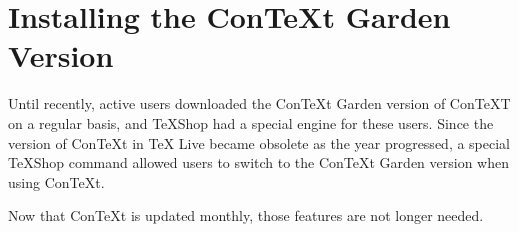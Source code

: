 \documentclass[11pt, oneside]{amsart}   	%
\begin{document}
\section{Installing the ConTeXt Garden Version}

Until recently, active users downloaded the ConTeXt Garden version of ConTeXT on
a regular basis, and TeXShop had a special engine for these users. Since the version
of ConTeXt in TeX Live became obsolete as the year progressed, a special TeXShop command allowed users to
switch to the ConTeXt Garden version when using ConTeXt.

Now that ConTeXt is updated monthly, those features are not longer needed.



%
%
%
%
%
\end{document}
